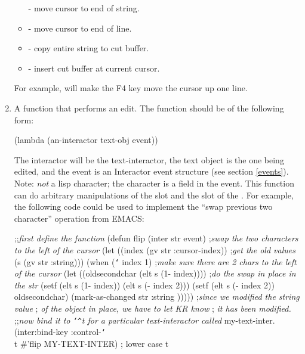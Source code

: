 \begin{enumerate}
\begin{itemize}
 - move cursor to end of string.

\item {} - move cursor to end of line.

\item {} - copy entire string to cut buffer.

\item {} - insert cut buffer at current cursor.
\end{itemize}
For example,  will make the F4 key
move the cursor up one line.


\item 
A function that performs an edit.  The function should be of the following
form:
\begin{programexample}
(lambda (an-interactor text-obj event))
\end{programexample}
The interactor will be the text-interactor, the text object is the one
being edited, and the event is an Interactor event structure (see section
\ref{events}). Note: {\it not} a lisp character; the character is a field in
the event.  This function can do arbitrary manipulations of the  slot
and the  slot of the .  For example,
the following code could be used to implement the ``swap previous two
character'' operation from EMACS:
\begin{programexample}
;;{\it first define the function}
(defun flip (inter str event) ;{\it swap the two characters to the left of the cursor}
  (let ((index (gv str :cursor-index)) ;{\it get the old values}
	(s (gv str :string)))
    (when ({\tt\char`\>} index 1)  ;{\it make sure there are 2 chars to the left of the cursor}
      (let ((oldsecondchar (elt s (1- index)))) ;{\it do the swap in place in the str}
	(setf (elt s (1- index)) (elt s (- index 2)))
	(setf (elt s (- index 2)) oldsecondchar)
	(mark-as-changed str :string ))))) ;{\it since we modified the string value}
				; {\it of the object in place, we have to let KR know}
				; {\it it has been modified.}
;;{\it now bind it to {\tt\char`\^}t for a particular text-interactor called} my-text-inter.
(inter:bind-key :control-{\tt\char`\\}t \#'flip MY-TEXT-INTER) ; lower case t
\end{programexample}

\end{enumerate}




